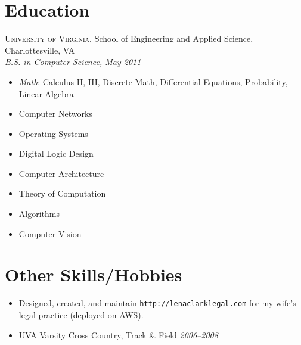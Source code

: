 \documentclass[a4paper,11pt]{article}
\begin{document}

\section*{Education}

  \textsc{University of Virginia}, School of Engineering and Applied Science,
  Charlottesville, VA \\
  \textit{B.S. in Computer Science, May 2011}

%

  \begin{multicols}{3}
    \raggedright

    \begin{itemize}
    \item \textit{Math}: Calculus II, III, Discrete Math, Differential Equations, Probability,
      Linear Algebra
    \item Computer Networks
    \item Operating Systems
    \item Digital Logic Design
    \item Computer Architecture
    \item Theory of Computation
    \item Algorithms
    \item Computer Vision
    \end{itemize}
  \end{multicols}



\vskip 4pt
\section*{Other Skills/Hobbies}
\vskip 5pt

  \begin{itemize}
    \item Designed, created, and maintain \texttt{http://lenaclarklegal.com} for my wife's legal
      practice (deployed on AWS).
    \item UVA Varsity Cross Country, Track \& Field \hfill \textit{2006--2008}
  \end{itemize}
\end{document}
